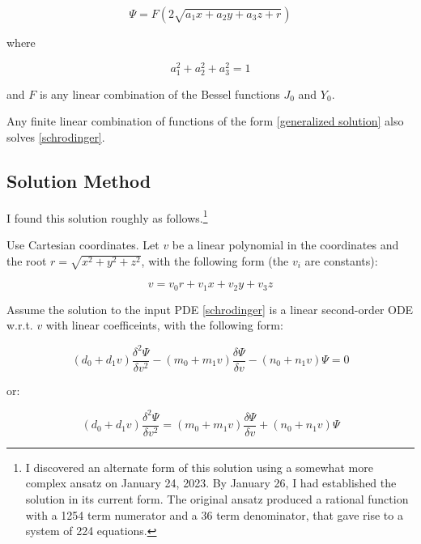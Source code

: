 \documentclass{article}
\begin{document}
\begin{equation}
\label{generalized solution}
\Psi = F(2\sqrt{a_1 x+ a_2 y+ a_3 z+r})
\end{equation}

where

\begin{equation*}
a_1^2+a_2^2+a_3^2=1
\end{equation*}

and $F$ is any linear combination of the Bessel functions $J_0$ and $Y_0$.

\vskip 12pt

Any finite linear combination of functions of the form \eqref{generalized solution} also solves \eqref{schrodinger}.

\subsection*{Solution Method}


I found this solution roughly as follows.\footnote{
I discovered an alternate form of this solution using a somewhat more complex ansatz
on January 24, 2023.  By January 26, I had established the solution in its current form.
The original ansatz produced a rational function with
a 1254 term numerator and a 36 term denominator, that gave rise to a system of 224 equations.
}

Use Cartesian coordinates.  Let $v$ be a linear polynomial in the coordinates and the root $r=\sqrt{x^2+y^2+z^2}$,
with the following form (the $v_i$ are constants):

\begin{equation}
\label{v ansatz}
v = v_0 r + v_1 x + v_2 y + v_3 z
\end{equation}

Assume the solution to the input PDE \eqref{schrodinger}
is a linear second-order ODE w.r.t. $v$ with linear coefficeints,
with the following form:

\begin{equation}
\label{psi ansatz}
(d_0 + d_1 v) \frac{\delta^2\Psi}{\delta v^2} - (m_0 + m_1 v) \frac{\delta\Psi}{\delta v} - (n_0 + n_1 v) \Psi = 0
\end{equation}

or:

\begin{equation}
\label{psi ansatz sub}
(d_0 + d_1 v) \frac{\delta^2\Psi}{\delta v^2} = (m_0 + m_1 v) \frac{\delta\Psi}{\delta v} + (n_0 + n_1 v) \Psi
\end{equation}
\end{document}
